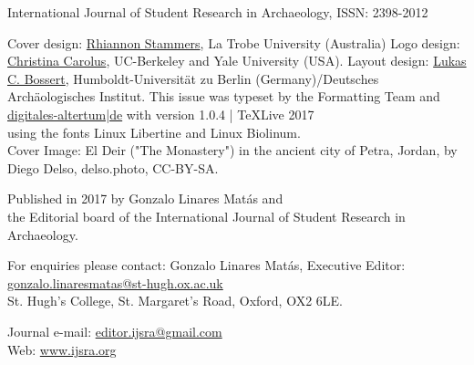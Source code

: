 \IJSRAtitlepage
\clearpage
\mypagesize
\thispagestyle{empty}
\hfill
\vfill

\begin{footnotesize}

\noindent International Journal of Student Research in Archaeology,\newline
ISSN: 2398-2012\newline
\monthyearnumber
\vspace{2em}


\noindent Cover design: \href{https://latrobe.academia.edu/RhiannonStammers}{Rhiannon Stammers}, La Trobe University (Australia)\newline
\noindent Logo design: \href{https://hraf.yale.edu/about/staff/christina-carolus/}{Christina Carolus}, UC-Berkeley and Yale University (USA).\newline
\noindent Layout design: \href{https://dainst.academia.edu/LukasCBossert}{Lukas C. Bossert}, Humboldt-Universität zu Berlin (Germany)/Deutsches Archäologisches Institut. \newline \indent This issue was typeset by the Formatting Team and \href{www.digitales-altertum.de}{digitales-altertum|de}  with  version 1.0.4 | \TeX Live 2017 \\ \indent using the fonts Linux Libertine and {\sffamily Linux Biolinum}.\\
Cover Image: 
El Deir ("The Monastery") in the ancient city of Petra, Jordan, by Diego Delso, delso.photo, CC-BY-SA.\\
\vspace{2em}

\noindent Published in 2017 by Gonzalo Linares Matás and \\ the Editorial board of the International Journal of Student Research in Archaeology. 




\vspace{2em}






\noindent For enquiries please contact: Gonzalo Linares Matás, Executive Editor:\\ \href{mailto:gonzalo.linaresmatas@st-hugh.ox.ac.uk}{gonzalo.linaresmatas@st-hugh.ox.ac.uk}\\  St. Hugh’s College, St. Margaret’s Road, Oxford, OX2 6LE.

\noindent Journal e-mail: \href{mailto:editor.ijsra@gmail.com}{editor.ijsra@gmail.com}\\
\noindent Web: \href{http://www.ijsra.org}{www.ijsra.org}


\end{footnotesize}
